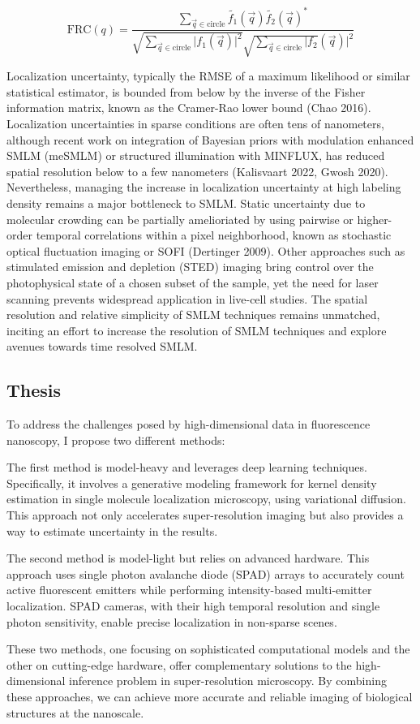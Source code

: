 \begin{equation*}
\mathrm{FRC}(q) = \frac{\sum_{\vec{q}\in\mathrm{circle}}\tilde{f_{1}}(\vec{q})\tilde{f_{2}}(\vec{q})^{*}}{\sqrt{\sum_{\vec{q}\in\mathrm{circle}}\lvert f_{1}(\vec{q})\lvert^{2}}\sqrt{\sum_{\vec{q}\in\mathrm{circle}}\lvert f_{2}}(\vec{q})\lvert^{2}}
\end{equation*}


Localization uncertainty, typically the RMSE of a maximum likelihood or similar statistical estimator, is bounded from below by the inverse of the Fisher information matrix, known as the Cramer-Rao lower bound (Chao 2016). Localization uncertainties in sparse conditions are often tens of nanometers, although recent work on integration of Bayesian priors with modulation enhanced SMLM (meSMLM) or structured illumination with MINFLUX, has reduced spatial resolution below to a few nanometers (Kalisvaart 2022, Gwosh 2020). Nevertheless, managing the increase in localization uncertainty at high labeling density remains a major bottleneck to SMLM. Static uncertainty due to molecular crowding can be partially amelioriated by using pairwise or higher-order temporal correlations within a pixel neighborhood, known as stochastic optical fluctuation imaging or SOFI (Dertinger 2009). Other approaches such as stimulated emission and depletion (STED) imaging bring control over the photophysical state of a chosen subset of the sample, yet the need for laser scanning prevents widespread application in live-cell studies. The spatial resolution and relative simplicity of SMLM techniques remains unmatched, inciting an effort to increase the resolution of SMLM techniques and explore avenues towards time resolved SMLM.

\subsection{Thesis}

To address the challenges posed by high-dimensional data in fluorescence nanoscopy, I propose two different methods:

The first method is model-heavy and leverages deep learning techniques. Specifically, it involves a generative modeling framework for kernel density estimation in single molecule localization microscopy, using variational diffusion. This approach not only accelerates super-resolution imaging but also provides a way to estimate uncertainty in the results.

The second method is model-light but relies on advanced hardware. This approach uses single photon avalanche diode (SPAD) arrays to accurately count active fluorescent emitters while performing intensity-based multi-emitter localization. SPAD cameras, with their high temporal resolution and single photon sensitivity, enable precise localization in non-sparse scenes.

These two methods, one focusing on sophisticated computational models and the other on cutting-edge hardware, offer complementary solutions to the high-dimensional inference problem in super-resolution microscopy. By combining these approaches, we can achieve more accurate and reliable imaging of biological structures at the nanoscale.

